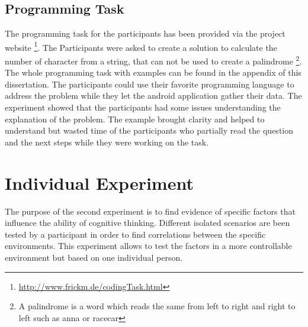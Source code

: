 \subsection{Programming Task}
The programming task for the participants has been provided via the project website \footnote{\url{http://www.frickm.de/codingTask.html}}. 
The Participants were asked to create a solution to calculate the number of character from a string, that can not be used to create a palindrome  \footnote{A palindrome is a word which reads the same from left to right and right to left such as anna or racecar}.
The whole programming task with examples can be found in the appendix of this dissertation. 
The participants could use their favorite programming language to address the problem while they let the android application gather their data. 
\bigbreak
The experiment showed that the participants had some issues understanding the explanation of the problem. The example brought clarity and helped to understand but wasted time of the participants who partially read the question and the next steps while they were working on the task.  
 
\section{Individual Experiment}
The purpose of the second experiment is to find evidence of specific factors that influence the ability of cognitive thinking. Different isolated scenarios are been tested by a participant in order to find correlations between the specific environments. 
This experiment allows to test the factors in a more controllable environment but based on one individual person. 


